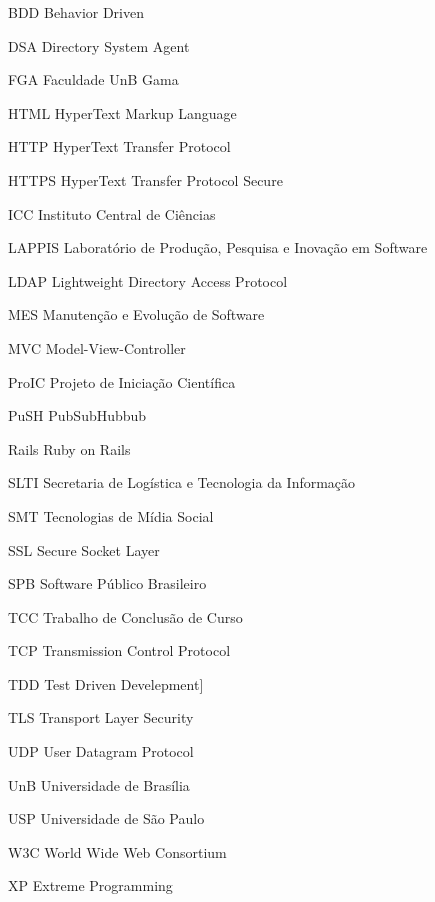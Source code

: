 \begin{siglas}
  \item[BDD] Behavior Driven 
  \item[DSA] Directory System Agent
  \item[FGA] Faculdade UnB Gama
  \item[HTML] HyperText Markup Language
  \item[HTTP] HyperText Transfer Protocol
  \item[HTTPS] HyperText Transfer Protocol Secure
  \item[ICC] Instituto Central de Ciências
  \item[LAPPIS] Laboratório de Produção, Pesquisa e Inovação em Software
  \item[LDAP] Lightweight Directory Access Protocol
  \item[MES] Manutenção e Evolução de Software
  \item[MVC] Model-View-Controller
  \item[ProIC] Projeto de Iniciação Científica
  \item[PuSH] PubSubHubbub
  \item[Rails] Ruby on Rails
  \item[SLTI] Secretaria de Logística e Tecnologia da Informação
  \item[SMT] Tecnologias de Mídia Social
  \item[SSL] Secure Socket Layer
  \item[SPB] Software Público Brasileiro
  \item[TCC] Trabalho de Conclusão de Curso
  \item[TCP] Transmission Control Protocol
  \item[TDD] Test Driven Develepment]
  \item[TLS] Transport Layer Security
  \item[UDP] User Datagram Protocol
  \item[UnB] Universidade de Brasília
  \item[USP] Universidade de São Paulo
  \item[W3C] World Wide Web Consortium
  \item[XP] Extreme Programming
\end{siglas}
